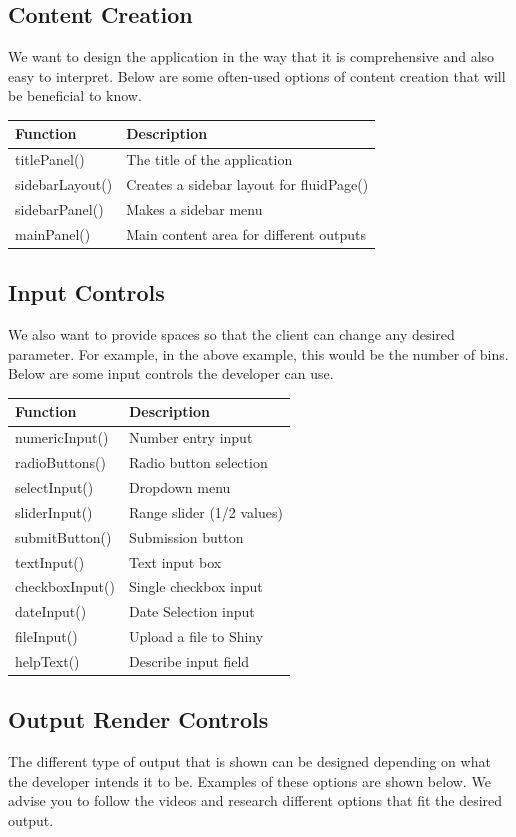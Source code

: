 \documentclass[12pt,]{krantz}
\begin{document}
\subsection*{Content Creation}\label{content-creation}


We want to design the application in the way that it is comprehensive
and also easy to interpret. Below are some often-used options of content
creation that will be beneficial to know.

\begin{longtable}[]{@{}ll@{}}
\toprule
Function & Description\tabularnewline
\midrule
\endhead
titlePanel() & The title of the application\tabularnewline
sidebarLayout() & Creates a sidebar layout for
fluidPage()\tabularnewline
sidebarPanel() & Makes a sidebar menu\tabularnewline
mainPanel() & Main content area for different outputs\tabularnewline
\bottomrule
\end{longtable}

\subsection*{Input Controls}\label{input-controls}


We also want to provide spaces so that the client can change any desired
parameter. For example, in the above example, this would be the number
of bins. Below are some input controls the developer can use.

\begin{longtable}[]{@{}ll@{}}
\toprule
Function & Description\tabularnewline
\midrule
\endhead
numericInput() & Number entry input\tabularnewline
radioButtons() & Radio button selection\tabularnewline
selectInput() & Dropdown menu\tabularnewline
sliderInput() & Range slider (1/2 values)\tabularnewline
submitButton() & Submission button\tabularnewline
textInput() & Text input box\tabularnewline
checkboxInput() & Single checkbox input\tabularnewline
dateInput() & Date Selection input\tabularnewline
fileInput() & Upload a file to Shiny\tabularnewline
helpText() & Describe input field\tabularnewline
\bottomrule
\end{longtable}

\subsection*{Output Render Controls}\label{output-render-controls}


The different type of output that is shown can be designed depending on
what the developer intends it to be. Examples of these options are shown
below. We advise you to follow the videos and research different options
that fit the desired output.
\end{document}
